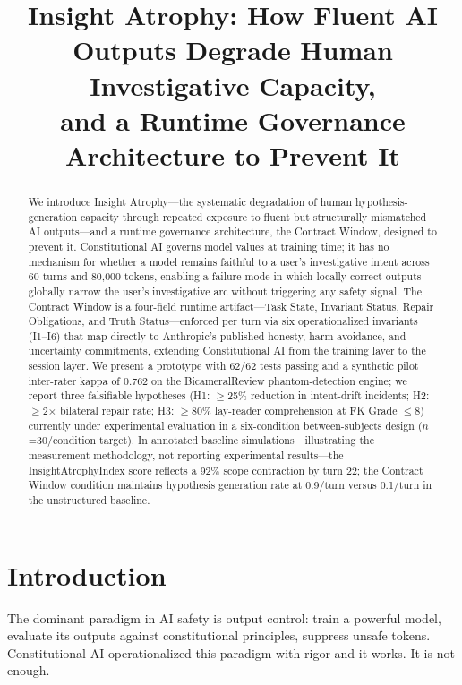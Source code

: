 \documentclass{article}
\title{Insight Atrophy: How Fluent AI Outputs Degrade Human Investigative Capacity, \\
and a Runtime Governance Architecture to Prevent It}
\newcommand{\cw}{Contract Window\xspace}
\newcommand{\ia}{Insight Atrophy\xspace}
\newcommand{\iai}{InsightAtrophyIndex\xspace}
\newcommand{\cai}{Constitutional AI\xspace}
\begin{document}
\ifcolmsubmission
\linenumbers
\fi

\maketitle

\begin{abstract}
We introduce \ia---the systematic degradation of human hypothesis-generation
capacity through repeated exposure to fluent but structurally mismatched AI
outputs---and a runtime governance architecture, the \cw, designed to prevent
it. \cai{} \citep{bai2022constitutional} governs model values at training time;
it has no mechanism for whether a model remains faithful to a user's
investigative intent across 60 turns and 80{,}000 tokens, enabling a failure
mode in which locally correct outputs globally narrow the user's investigative
arc without triggering any safety signal. The \cw{} is a four-field runtime
artifact---Task State, Invariant Status, Repair Obligations, and Truth
Status---enforced per turn via six operationalized invariants (I1--I6) that
map directly to Anthropic's published honesty, harm avoidance, and uncertainty
commitments, extending \cai{} from the training layer to the session layer. We
present a prototype with 62/62 tests passing and a synthetic pilot inter-rater
kappa of 0.762 on the BicameralReview phantom-detection engine; we report three
falsifiable hypotheses (H1: $\geq$25\% reduction in intent-drift incidents;
H2: $\geq$2$\times$ bilateral repair rate; H3: $\geq$80\% lay-reader
comprehension at FK Grade $\leq$8) currently under experimental evaluation in
a six-condition between-subjects design ($n$=30/condition target). In
annotated baseline simulations---illustrating the measurement methodology, not
reporting experimental results---the \iai{} score reflects a 92\% scope
contraction by turn 22; the \cw{} condition maintains hypothesis generation
rate at 0.9/turn versus 0.1/turn in the unstructured baseline.
\end{abstract}

\section{Introduction}
\label{sec:intro}

The dominant paradigm in AI safety is output control: train a powerful model,
evaluate its outputs against constitutional principles, suppress unsafe tokens.
\cai{} \citep{bai2022constitutional} operationalized this paradigm with rigor
and it works. It is not enough.
\end{document}
